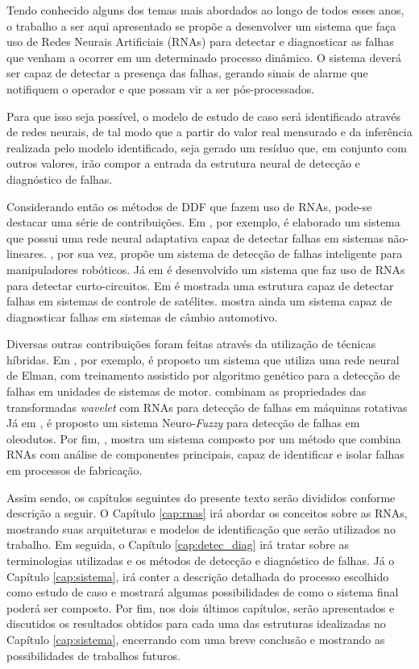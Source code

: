 Tendo conhecido alguns dos temas mais abordados ao longo de todos esses anos, o
trabalho a ser aqui apresentado se propõe a desenvolver um sistema que faça uso
de Redes Neurais Artificiais (RNAs) para detectar e diagnosticar as falhas que
venham a ocorrer em um determinado processo dinâmico. O sistema deverá ser capaz
de detectar a presença das falhas, gerando sinais de alarme que notifiquem o
operador e que possam vir a ser pós-processados.


Para que isso seja possível, o modelo de estudo de caso será identificado
através de redes neurais, de tal modo que a partir do valor real mensurado e da
inferência realizada pelo modelo identificado, seja gerado um resíduo que, em
conjunto com outros valores, irão compor a entrada da estrutura neural de
detecção e diagnóstico de falhas.

Considerando então os métodos de DDF que fazem uso de RNAs, pode-se destacar uma
série de contribuições. Em , por exemplo, é elaborado
um sistema que possui uma rede neural adaptativa capaz de detectar falhas em
sistemas não-lineares. , por sua vez, propõe um sistema
de detecção de falhas inteligente para manipuladores robóticos. Já em
 é desenvolvido um sistema que faz uso de RNAs para
detectar curto-circuitos. Em  é mostrada uma estrutura
capaz de detectar falhas em sistemas de controle de satélites.
 mostra ainda um sistema capaz de diagnosticar falhas em
sistemas de câmbio automotivo.

Diversas outras contribuições foram feitas através da utilização de técnicas
híbridas. Em , por exemplo, é proposto um sistema que
utiliza uma rede neural de Elman, com treinamento assistido por algoritmo
genético para a detecção de falhas em unidades de sistemas de motor.
 combinam as propriedades das transformadas {\it wavelet}
com RNAs para detecção de falhas em máquinas rotativas Já em
, é proposto um sistema Neuro-{\it Fuzzy} para detecção de
falhas em oleodutos. Por fim, , mostra um sistema
composto por um método que combina RNAs com análise de componentes principais,
capaz de identificar e isolar falhas em processos de fabricação.

Assim sendo, os capítulos seguintes do presente texto serão divididos conforme
descrição a seguir. O Capítulo \ref{cap:rnas} irá abordar os conceitos sobre as
RNAs, mostrando suas arquiteturas e modelos de identificação que serão
utilizados no trabalho. Em seguida, o Capítulo \ref{cap:detec_diag} irá tratar
sobre as terminologias utilizadas e os métodos de detecção e diagnóstico de
falhas. Já o Capítulo \ref{cap:sistema}, irá conter a descrição detalhada do
processo escolhido como estudo de caso e mostrará algumas possibilidades de como
o sistema final poderá ser composto. Por fim, nos dois últimos capítulos, serão
apresentados e discutidos os resultados obtidos para cada uma das estruturas
idealizadas no Capítulo \ref{cap:sistema}, encerrando com uma breve conclusão e
mostrando as possibilidades de trabalhos futuros.
